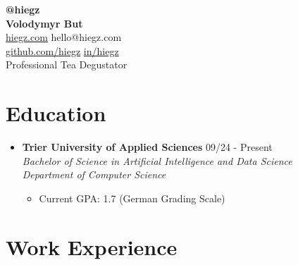 \documentclass[]{article}
\begin{document}
\begin{center}
    \textbf{\Large @hiegz} \\[3pt]
    \textbf{\huge Volodymyr But} \\[7pt]

     \href{https://www.hiegz.com}{hiegz.com}
    \hspace{5pt}
     hello@hiegz.com \\[2pt]

     \href{https://github.com/hiegz}{github.com/hiegz}
    \hspace{5pt}
     \href{https://linkedin.com/in/hiegz}{in/hiegz} \\[10pt]

    Professional Tea Degustator
\end{center}

\section{Education}

\begin{itemize}[leftmargin=0.15in, rightmargin=0.15in, label={}]
    \item {\large\bfseries Trier University of Applied Sciences} \hfill 09/24 - Present \\
        {\itshape Bachelor of Science in Artificial Intelligence and Data Science \\ Department of Computer Science}

        \begin{itemize}
            \item Current GPA: 1.7 (German Grading Scale)
        \end{itemize}
\end{itemize}

\section{Work Experience}
\end{document}
